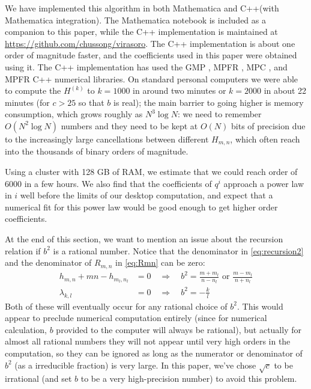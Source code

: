 \documentclass[12pt]{article}
\numberwithin{equation}{section}
\newcommand{\magenta}{\bf\color{magenta}}
\begin{document}
We have implemented this algorithm in both Mathematica and C++(with Mathematica integration). The Mathematica notebook is included as a companion to this paper, while the C++ implementation  is maintained at \url{https://github.com/chussong/virasoro}. The C++ implementation is about one order of magnitude faster, and the coefficients used in this paper were obtained using it. The C++ implementation has used the GMP \cite{gnu:gmp}, MPFR \cite{gnu:mpfr}, MPC \cite{gnu:mpc}, and MPFR C++ \cite{gnu:mpfrcpp} numerical libraries. On standard personal computers we were able to compute the $H^{(k)}$ to $k=1000$ in around two minutes or $k=2000$ in about 22 minutes (for $c>25$ so that $b$ is real); the main barrier to going higher is memory consumption, which grows roughly as $N^3 \log N$: we need to remember $O(N^2 \log N)$ numbers and they need to be kept at $O(N)$ bits of precision due to the increasingly large cancellations between different $H_{m,n}$, which often reach into the thousands of binary orders of magnitude. 

Using a cluster with 128 GB of RAM, we estimate that we could reach order of $6000$ in a few hours. We also find that the coefficients of $q^i$ approach a power law in 
$i$ well before the limits of our desktop computation, and expect that a numerical fit for 
this power law would be good enough to get higher order coefficients.

At the end of this section, we want to mention an issue about the recursion relation if $b^2$ is a rational number. Notice that the denominator in \ref{eq:recursion2} and the denominator of $R_{m,n}$ in \ref{eq:Rmn} can be zero:
 \begin{align}
	h_{m,n} + mn - h_{m_l,n_l} &= 0\quad \Rightarrow \quad b^2=\frac{m+m_l}{n-n_l} \text{ or } \frac{m-m_l}{n+n_l}\\
	\lambda_{k,l} &=0\quad \Rightarrow \quad b^2=-\frac{k}{l}
	\end{align}
Both of these will eventually occur for any rational choice of $b^2$.  This would appear to preclude numerical computation entirely (since for numerical calculation, $b$ provided to the computer will always be rational), but actually for almost all rational numbers they will not appear until very high orders in the computation, so they can be ignored as long as the numerator or denominator of $b^2$ (as a irreducible fraction) is very large. In this paper, we've chose $\sqrt{c}$ to be irrational (and set $b$ to be a very high-precision number) to avoid this problem.
\end{document}
